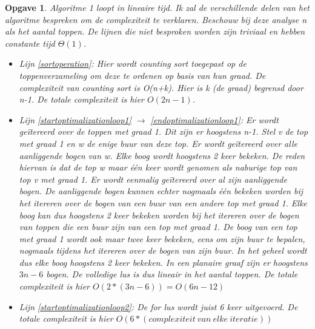\documentclass[11pt, a4paper]{article}
\newtheorem{opgave}{Opgave}
\begin{document}
\begin{opgave}
		Algoritme 1 loopt in lineaire tijd. Ik zal de verschillende delen van het algoritme bespreken om de complexiteit te verklaren. Beschouw bij deze analyse n als het aantal toppen. De lijnen die niet besproken worden zijn triviaal en hebben constante tijd $\Theta(1)$.
		\begin{itemize}
			 \item Lijn \ref{sortoperation}: Hier wordt counting sort toegepast op de toppenverzameling om deze te ordenen op basis van hun graad. De complexiteit van counting sort is O(n+k). Hier is k (de graad) begrensd door n-1. De totale complexiteit is hier $O(2n-1)$.
			 \item Lijn \ref{startoptimalizationloop1} $\rightarrow$ \ref{endoptimalizationloop1}: Er wordt ge\"{i}tereerd over de toppen met graad 1. Dit zijn er hoogstens n-1. Stel v de top met graad 1 en w de enige buur van deze top. 
			 Er wordt ge\"{i}tereerd over alle aanliggende bogen van w. Elke boog wordt hoogstens 2 keer bekeken. De reden hiervan is dat de top w maar \'{e}\'{e}n keer wordt genomen als naburige top van top v met graad 1. Er wordt eenmalig ge\"{i}tereerd over al zijn aanliggende bogen. De aanliggende bogen kunnen echter nogmaals \'{e}\'{e}n bekeken worden bij het itereren over de bogen van een buur van een andere top met graad 1. 
			 Elke boog kan dus hoogstens 2 keer bekeken worden bij het itereren over de bogen van toppen die een buur zijn van een top met graad 1. De boog van een top met graad 1 wordt ook maar twee keer bekeken, eens om zijn buur te bepalen, nogmaals tijdens het itereren over de bogen van zijn buur. In het geheel wordt dus elke boog hoogstens 2 keer bekeken. 
			 In een planaire graaf zijn er hoogstens $3n-6$ bogen. De volledige lus is dus lineair in het aantal toppen. De totale complexiteit is hier $O(2*(3n-6)) = O(6n-12)$
			\item Lijn \ref{startoptimalizationloop2}: De for lus wordt juist 6 keer uitgevoerd. De totale complexiteit is hier 
			$O(6*(complexiteit\ van\ elke\ iteratie))$

\end{itemize}
\end{opgave}
\end{document}
